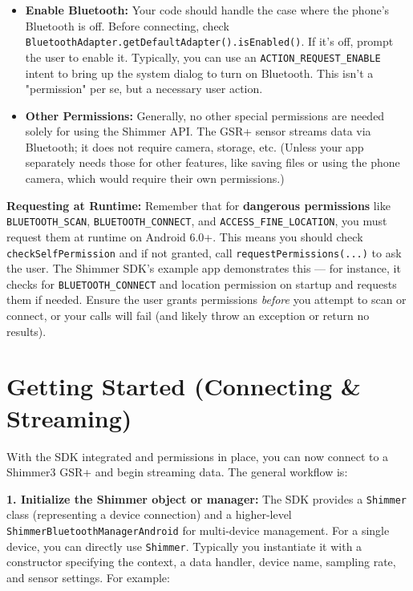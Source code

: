 \begin{itemize}
\item \textbf{Enable Bluetooth:} Your code should handle the case where the
  phone's Bluetooth is off. Before connecting, check
  \texttt{BluetoothAdapter.getDefaultAdapter().isEnabled()}. If it's off,
  prompt the user to enable it. Typically, you can use an
  \texttt{ACTION_REQUEST_ENABLE} intent to bring up the system dialog to turn
  on
  Bluetooth\cite{DeviceServer}.
  This isn't a "permission" per se, but a necessary user action.

\item \textbf{Other Permissions:} Generally, no other special permissions are
  needed solely for using the Shimmer API. The GSR+ sensor streams data
  via Bluetooth; it does not require camera, storage, etc. (Unless your
  app separately needs those for other features, like saving files or
  using the phone camera, which would require their own permissions.)

\end{itemize}
\textbf{Requesting at Runtime:} Remember that for \textbf{dangerous permissions}
like \texttt{BLUETOOTH_SCAN}, \texttt{BLUETOOTH_CONNECT}, and \texttt{ACCESS_FINE_LOCATION},
you must request them at runtime on Android 6.0+. This means you should
check \texttt{checkSelfPermission} and if not granted, call
\texttt{requestPermissions(...)} to ask the user. The Shimmer SDK's example app
demonstrates this --- for instance, it checks for \texttt{BLUETOOTH_CONNECT} and
location permission on startup and requests them if
needed\cite{ElectrodermalActivityWiki}.
Ensure the user grants permissions \textit{before} you attempt to scan or
connect, or your calls will fail (and likely throw an exception or
return no results).

\section{Getting Started (Connecting & Streaming)}

With the SDK integrated and permissions in place, you can now connect to
a Shimmer3 GSR+ and begin streaming data. The general workflow is:

\textbf{1. Initialize the Shimmer object or manager:} The SDK provides a
\texttt{Shimmer} class (representing a device connection) and a higher-level
\texttt{ShimmerBluetoothManagerAndroid} for multi-device management. For a
single device, you can directly use \texttt{Shimmer}. Typically you instantiate
it with a constructor specifying the context, a data handler, device
name, sampling rate, and sensor settings. For example:

